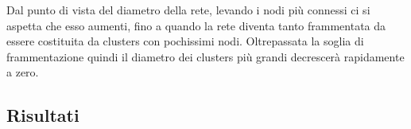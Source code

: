 Dal punto di vista del diametro della rete, levando i nodi più connessi ci si aspetta che esso aumenti, fino a quando la rete diventa tanto frammentata da essere costituita da clusters con pochissimi nodi. Oltrepassata la soglia di frammentazione quindi il diametro dei clusters più grandi decrescerà rapidamente a zero.

\subsection{Risultati}
\begin{figure}[p!]
	\centering
	$\;$
	\\
	$\;$

\end{figure}

